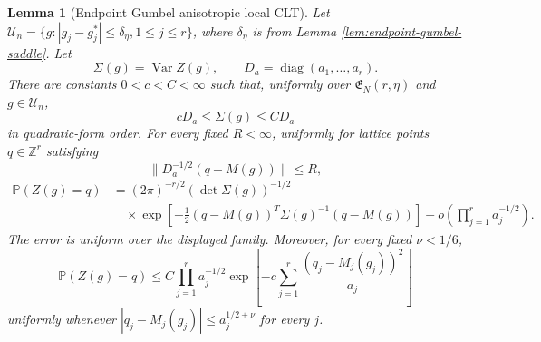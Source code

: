 \documentclass[11pt]{article}
\newtheorem{lemma}[theorem]{Lemma}
\theoremstyle{remark}
\newcommand{\Pp}{\mathbb P}
\newcommand{\Var}{\operatorname{Var}}
\newcommand{\diag}{\operatorname{diag}}
\begin{document}
\begin{lemma}[Endpoint Gumbel anisotropic local CLT]
\label{lem:endpoint-gumbel-llt}
Let \(\mathcal U_n=\{g:|g_j-g_j^*|\le\delta_\eta,
1\le j\le r\}\), where \(\delta_\eta\) is from Lemma
\ref{lem:endpoint-gumbel-saddle}.  Let
\[
        \Sigma(g)=\Var Z(g),
        \qquad
        D_a=\diag(a_1,\ldots,a_r).
\]
There are constants \(0<c<C<\infty\) such that, uniformly over
\(\mathfrak E_N(r,\eta)\) and \(g\in\mathcal U_n\),
\[
        cD_a\le\Sigma(g)\le CD_a
\tag{8.12}\label{eq:endpoint-covariance-comparison}
\]
in quadratic-form order.  For every fixed \(R<\infty\), uniformly for lattice
points \(q\in\mathbb Z^r\) satisfying
\[
        \|D_a^{-1/2}(q-M(g))\|\le R,
\]
\[
\begin{aligned}
\Pp(Z(g)=q)
&=(2\pi)^{-r/2}(\det\Sigma(g))^{-1/2}\\
&\quad\times
\exp\left[-\frac12(q-M(g))^T\Sigma(g)^{-1}(q-M(g))\right]
+o\left(\prod_{j=1}^r a_j^{-1/2}\right).
\end{aligned}
\tag{8.13}\label{eq:endpoint-gumbel-llt}
\]
The error is uniform over the displayed family.  Moreover, for every fixed
\(\nu<1/6\),
\[
\Pp(Z(g)=q)
\le C\prod_{j=1}^r a_j^{-1/2}
\exp\left[-c\sum_{j=1}^r
\frac{(q_j-M_j(g_j))^2}{a_j}\right]
\tag{8.14}\label{eq:endpoint-gumbel-local-upper}
\]
uniformly whenever
\(|q_j-M_j(g_j)|\le a_j^{1/2+\nu}\) for every \(j\).
\end{lemma}
\end{document}
